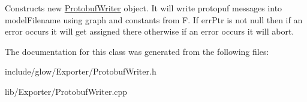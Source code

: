 Constructs new \hyperlink{classglow_1_1_protobuf_writer}{Protobuf\+Writer} object. It will write protopuf messages into {\ttfamily model\+Filename} using graph and constants from {\ttfamily F}. If {\ttfamily err\+Ptr} is not null then if an error occurs it will get assigned there otherwise if an error occurs it will abort. 

The documentation for this class was generated from the following files\+:\begin{DoxyCompactItemize}
\item 
include/glow/\+Exporter/Protobuf\+Writer.\+h\item 
lib/\+Exporter/Protobuf\+Writer.\+cpp\end{DoxyCompactItemize}
